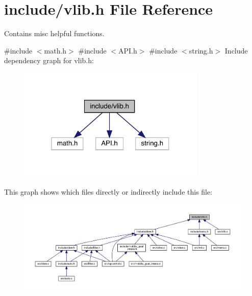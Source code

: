 \section{include/vlib.h File Reference}
\label{vlib_8h}


Contains misc helpful functions.  


{\ttfamily \#include $<$math.\+h$>$}\newline
{\ttfamily \#include $<$A\+P\+I.\+h$>$}\newline
{\ttfamily \#include $<$string.\+h$>$}\newline
Include dependency graph for vlib.\+h\+:
\nopagebreak
\begin{figure}[H]
\begin{center}
\leavevmode
\includegraphics[width=253pt]{vlib_8h__incl}
\end{center}
\end{figure}
This graph shows which files directly or indirectly include this file\+:
\nopagebreak
\begin{figure}[H]
\begin{center}
\leavevmode
\includegraphics[width=350pt]{vlib_8h__dep__incl}
\end{center}
\end{figure}
